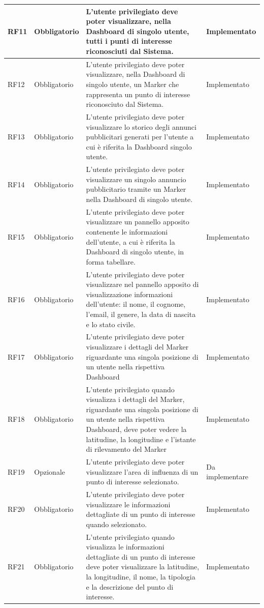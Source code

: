 \documentclass[10pt]{article}
\begin{document}
\begin{longtable}{|>{\centering\arraybackslash}m{2.7cm}|>{\centering\arraybackslash}m{2.7cm}|>{\raggedright\arraybackslash}m{6cm}|>{\centering\arraybackslash}m{2.1cm}|}
    \hline
    RF11 & Obbligatorio & L'utente privilegiato deve poter visualizzare, nella Dashboard di singolo utente, tutti i punti di interesse riconosciuti dal Sistema. & Implementato \\
    \hline
    RF12 & Obbligatorio & L'utente privilegiato deve poter visualizzare, nella Dashboard di singolo utente, un Marker che rappresenta un punto di interesse riconosciuto dal Sistema. & Implementato \\
    \hline
    RF13 & Obbligatorio & L'utente privilegiato deve poter visualizzare lo storico degli annunci pubblicitari generati per l'utente a cui è riferita la Dashboard singolo utente. & Implementato \\
    \hline
    RF14 & Obbligatorio & L'utente privilegiato deve poter visualizzare un singolo annuncio pubblicitario tramite un Marker nella Dashboard di singolo utente. & Implementato \\
    \hline
    RF15 & Obbligatorio & L'utente privilegiato deve poter visualizzare un pannello apposito contenente le informazioni dell'utente, a cui è riferita la Dashboard di singolo utente, in forma tabellare. & Implementato \\
    \hline
    RF16 & Obbligatorio & L'utente privilegiato deve poter visualizzare nel pannello apposito di visualizzazione informazioni dell'utente: il nome, il cognome, l'email, il genere, la data di nascita e lo stato civile. & Implementato \\
    \hline
    RF17 & Obbligatorio & L'utente privilegiato deve poter visualizzare i dettagli del Marker riguardante una singola posizione di un utente nella rispettiva Dashboard & Implementato \\
    \hline
    RF18 & Obbligatorio & L'utente privilegiato quando visualizza i dettagli del Marker, riguardante una singola posizione di un utente nella rispettiva Dashboard, deve poter vedere la latitudine, la longitudine e l'istante di rilevamento del Marker & Implementato \\
    \hline
    RF19 & Opzionale & L'utente privilegiato deve poter visualizzare l'area di influenza di un punto di interesse selezionato. & Da implementare \\
    \hline
    RF20 & Obbligatorio & L'utente privilegiato deve poter visualizzare le informazioni dettagliate di un punto di interesse quando selezionato. & Implementato \\
    \hline
    RF21 & Obbligatorio & L'utente privilegiato quando visualizza le informazioni dettagliate di un punto di interesse deve poter visualizzare la latitudine, la longitudine, il nome, la tipologia e la descrizione del punto di interesse. & Implementato \\

\end{longtable}
\end{document}
